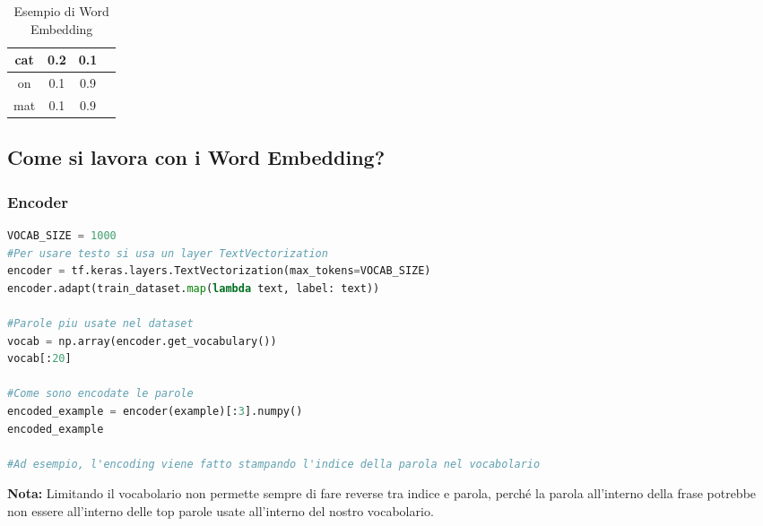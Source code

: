 \begin{table}[H]
    \centering
    \begin{tabular}{|c|c|c|c|}
        \hline
        cat & 0.2 & 0.1 & \\
        \hline
        on  & 0.1 & 0.9 & \\
        \hline
        mat & 0.1 & 0.9 & \\
        \hline
    \end{tabular}
    \caption{Esempio di Word Embedding}
\end{table}

\subsection{Come si lavora con i Word Embedding?}

\subsubsection{Encoder}
\begin{lstlisting}[language=Python, caption={Esempio di Word Embedding}]
VOCAB_SIZE = 1000
#Per usare testo si usa un layer TextVectorization
encoder = tf.keras.layers.TextVectorization(max_tokens=VOCAB_SIZE)
encoder.adapt(train_dataset.map(lambda text, label: text))

#Parole piu usate nel dataset
vocab = np.array(encoder.get_vocabulary())
vocab[:20]

#Come sono encodate le parole
encoded_example = encoder(example)[:3].numpy()
encoded_example

#Ad esempio, l'encoding viene fatto stampando l'indice della parola nel vocabolario


\end{lstlisting}

\textbf{Nota:} Limitando il vocabolario non permette sempre di fare reverse tra indice e parola, perché la parola all'interno della frase potrebbe non essere all'interno delle top parole usate all'interno del nostro vocabolario.

\newpage